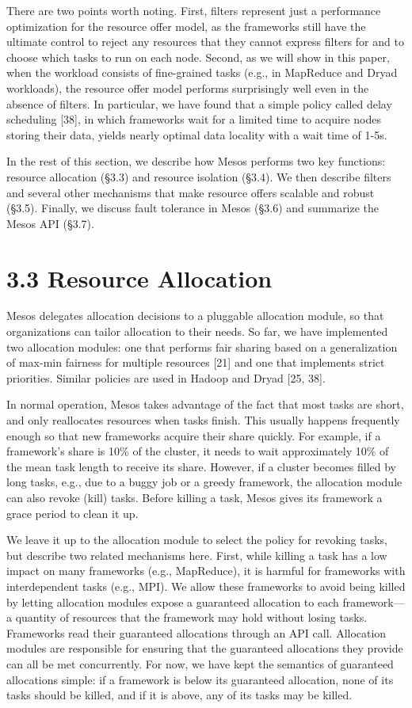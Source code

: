 \documentclass[
]{article}
\newcounter{none} %
\begin{document}
There are two points worth noting. First, filters represent just a
performance optimization for the resource offer model, as the frameworks
still have the ultimate control to reject any resources that they cannot
express filters for and to choose which tasks to run on each node.
Second, as we will show in this paper, when the workload consists of
fine-grained tasks (e.g., in MapReduce and Dryad workloads), the
resource offer model performs surprisingly well even in the absence of
filters. In particular, we have found that a simple policy called delay
scheduling {[}38{]}, in which frameworks wait for a limited time to
acquire nodes storing their data, yields nearly optimal data locality
with a wait time of 1-5s.

In the rest of this section, we describe how Mesos performs two key
functions: resource allocation (§3.3) and resource isolation (§3.4). We
then describe filters and several other mechanisms that make resource
offers scalable and robust (§3.5). Finally, we discuss fault tolerance
in Mesos (§3.6) and summarize the Mesos API (§3.7).

\section{3.3 Resource Allocation}\label{resource-allocation}

Mesos delegates allocation decisions to a pluggable allocation module,
so that organizations can tailor allocation to their needs. So far, we
have implemented two allocation modules: one that performs fair sharing
based on a generalization of max-min fairness for multiple resources
{[}21{]} and one that implements strict priorities. Similar policies are
used in Hadoop and Dryad {[}25, 38{]}.

In normal operation, Mesos takes advantage of the fact that most tasks
are short, and only reallocates resources when tasks finish. This
usually happens frequently enough so that new frameworks acquire their
share quickly. For example, if a framework's share is 10\% of the
cluster, it needs to wait approximately 10\% of the mean task length to
receive its share. However, if a cluster becomes filled by long tasks,
e.g., due to a buggy job or a greedy framework, the allocation module
can also revoke (kill) tasks. Before killing a task, Mesos gives its
framework a grace period to clean it up.

We leave it up to the allocation module to select the policy for
revoking tasks, but describe two related mechanisms here. First, while
killing a task has a low impact on many frameworks (e.g., MapReduce), it
is harmful for frameworks with interdependent tasks (e.g., MPI). We
allow these frameworks to avoid being killed by letting allocation
modules expose a guaranteed allocation to each framework---a quantity of
resources that the framework may hold without losing tasks. Frameworks
read their guaranteed allocations through an API call. Allocation
modules are responsible for ensuring that the guaranteed allocations
they provide can all be met concurrently. For now, we have kept the
semantics of guaranteed allocations simple: if a framework is below its
guaranteed allocation, none of its tasks should be killed, and if it is
above, any of its tasks may be killed.
\end{document}
